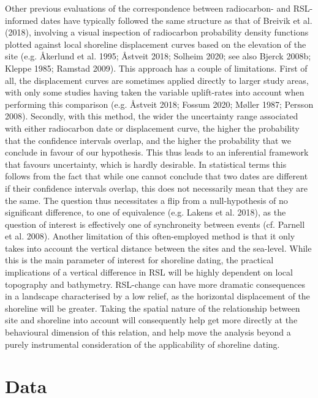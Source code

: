 \documentclass[
]{article}
\begin{document}
Other previous evaluations of the correspondence between radiocarbon- and RSL-informed dates have typically followed the same structure as that of Breivik et al. (2018), involving a visual inspection of radiocarbon probability density functions plotted against local shoreline displacement curves based on the elevation of the site (e.g. Åkerlund et al. 1995; Åstveit 2018; Solheim 2020; see also Bjerck 2008b; Kleppe 1985; Ramstad 2009). This approach has a couple of limitations. First of all, the displacement curves are sometimes applied directly to larger study areas, with only some studies having taken the variable uplift-rates into account when performing this comparison (e.g. Åstveit 2018; Fossum 2020; Møller 1987; Persson 2008). Secondly, with this method, the wider the uncertainty range associated with either radiocarbon date or displacement curve, the higher the probability that the confidence intervals overlap, and the higher the probability that we conclude in favour of our hypothesis. This thus leads to an inferential framework that favours uncertainty, which is hardly desirable. In statistical terms this follows from the fact that while one cannot conclude that two dates are different if their confidence intervals overlap, this does not necessarily mean that they are the same. The question thus necessitates a flip from a null-hypothesis of no significant difference, to one of equivalence (e.g. Lakens et al. 2018), as the question of interest is effectively one of synchroneity between events (cf. Parnell et al. 2008). Another limitation of this often-employed method is that it only takes into account the vertical distance between the sites and the sea-level. While this is the main parameter of interest for shoreline dating, the practical implications of a vertical difference in RSL will be highly dependent on local topography and bathymetry. RSL-change can have more dramatic consequences in a landscape characterised by a low relief, as the horizontal displacement of the shoreline will be greater. Taking the spatial nature of the relationship between site and shoreline into account will consequently help get more directly at the behavioural dimension of this relation, and help move the analysis beyond a purely instrumental consideration of the applicability of shoreline dating.

\hypertarget{data}{%
\section{Data}\label{data}}
\end{document}
